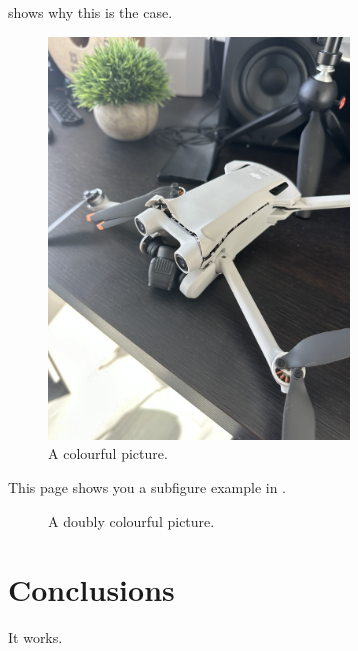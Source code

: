 \documentclass{ecsproject}     %
\begin{document}
 shows why this is the case.
\begin{figure}[!htb]
  \centering
  \includegraphics[width=8cm]{test.JPG}
  \caption{A colourful picture.}
  \label{Figure:figex}
\end{figure}
\newpage\textsl{}
This page shows you a subfigure example in .
\begin{figure}[!htb]
  \centering
  \caption{A doubly colourful picture.}
  \label{Figure:figsubex}
\end{figure}


\chapter{Conclusions} \label{Chapter:Conclusions}
It works.



% 
\backmatter


\end{document}
